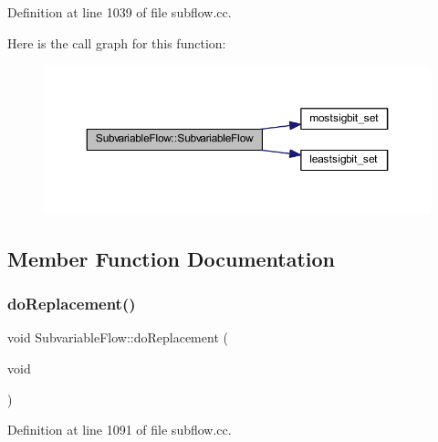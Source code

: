 Definition at line 1039 of file subflow.\+cc.

Here is the call graph for this function\+:
\nopagebreak
\begin{figure}[H]
\begin{center}
\leavevmode
\includegraphics[width=350pt]{class_subvariable_flow_aa87462fad4038e164a4840e3ed508ce0_cgraph}
\end{center}
\end{figure}


\subsection{Member Function Documentation}
\mbox{\label{class_subvariable_flow_a75dd5e28aa46641f1561b1c51f0876c1}} 
\subsubsection{\texorpdfstring{doReplacement()}{doReplacement()}}
{\footnotesize\ttfamily void Subvariable\+Flow\+::do\+Replacement (\begin{DoxyParamCaption}\item[{void}]{ }\end{DoxyParamCaption})}



Definition at line 1091 of file subflow.\+cc.

